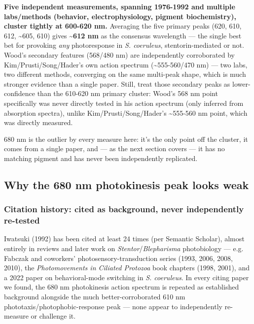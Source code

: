 \documentclass[
]{article}
\begin{document}
\textbf{Five independent measurements, spanning 1976-1992 and multiple
labs/methods (behavior, electrophysiology, pigment biochemistry),
cluster tightly at 600-620 nm.} Averaging the five primary peaks (620,
610, 612, \textasciitilde605, 610) gives \textbf{\textasciitilde612 nm}
as the consensus wavelength --- the single best bet for provoking
\emph{any} photoresponse in \emph{S. coeruleus}, stentorin-mediated or
not. Wood's secondary features (568/480 nm) are independently
corroborated by Kim/Prusti/Song/Hader's own action spectrum
(\textasciitilde555-560/470 nm) --- two labs, two different methods,
converging on the same multi-peak shape, which is much stronger evidence
than a single paper. Still, treat those secondary peaks as
lower-confidence than the 610-620 nm primary cluster: Wood's 568 nm
point specifically was never directly tested in his action spectrum
(only inferred from absorption spectra), unlike Kim/Prusti/Song/Hader's
\textasciitilde555-560 nm point, which was directly measured.

680 nm is the outlier by every measure here: it's the only point off the
cluster, it comes from a single paper, and --- as the next section
covers --- it has no matching pigment and has never been independently
replicated.

\hypertarget{why-the-680-nm-photokinesis-peak-looks-weak}{%
\subsection{Why the 680 nm photokinesis peak looks
weak}\label{why-the-680-nm-photokinesis-peak-looks-weak}}

\hypertarget{citation-history-cited-as-background-never-independently-re-tested}{%
\subsubsection{Citation history: cited as background, never
independently
re-tested}\label{citation-history-cited-as-background-never-independently-re-tested}}

Iwatsuki (1992) has been cited at least 24 times (per Semantic Scholar),
almost entirely in reviews and later work on
\emph{Stentor}/\emph{Blepharisma} photobiology --- e.g. Fabczak and
coworkers' photosensory-transduction series (1993, 2006, 2008, 2010),
the \emph{Photomovements in Ciliated Protozoa} book chapters (1998,
2001), and a 2022 paper on behavioral-mode switching in \emph{S.
coeruleus}. In every citing paper we found, the 680 nm photokinesis
action spectrum is repeated as established background alongside the much
better-corroborated 610 nm phototaxis/photophobic-response peak --- none
appear to independently re-measure or challenge it.
\end{document}
